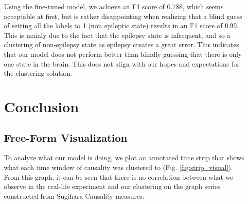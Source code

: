 \documentclass[journal,12pt,onecolumn,draftclsnofoot]{IEEEtran}  %
\begin{document}
Using the fine-tuned model, we achieve an F1 score of 0.788, which seems acceptable at first, but is rather disappointing when realizing that a blind guess of setting all the labels to 1 (non epileptic state) results in an F1 score of 0.99. This is mainly due to the fact that the epilepsy state is infrequent, and so a clustering of non-epilepsy state as epilepsy creates a great error. This indicates that our model does not perform better than blindly guessing that there is only one state in the brain. This does not align with our hopes and expectations for the clustering solution. 





\section{Conclusion}

\subsection{Free-Form Visualization}
To analyze what our model is doing, we plot an annotated time strip that shows what each time window of causality was clustered to (Fig. \ref{fig:strip_visual}). From this graph, it can be seen that there is no correlation between what we observe in the real-life experiment and our clustering on the graph series constructed from Sugihara Causality measures. 
\end{document}
